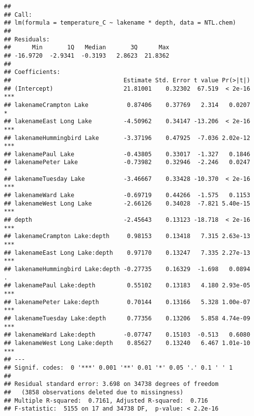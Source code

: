 \documentclass[]{article}
\newenvironment{Shaded}{\begin{snugshade}}{\end{snugshade}}
\newcommand{\CommentTok}[1]{\textcolor[rgb]{0.56,0.35,0.01}{\textit{#1}}}
\newcommand{\DataTypeTok}[1]{\textcolor[rgb]{0.13,0.29,0.53}{#1}}
\newcommand{\KeywordTok}[1]{\textcolor[rgb]{0.13,0.29,0.53}{\textbf{#1}}}
\newcommand{\NormalTok}[1]{#1}
\newcommand{\OperatorTok}[1]{\textcolor[rgb]{0.81,0.36,0.00}{\textbf{#1}}}
\newcommand{\StringTok}[1]{\textcolor[rgb]{0.31,0.60,0.02}{#1}}
\begin{document}
\begin{Shaded}
\end{Shaded}

\begin{verbatim}
## 
## Call:
## lm(formula = temperature_C ~ lakename * depth, data = NTL.chem)
## 
## Residuals:
##      Min       1Q   Median       3Q      Max 
## -16.9720  -2.9341  -0.3193   2.8623  21.8362 
## 
## Coefficients:
##                                Estimate Std. Error t value Pr(>|t|)    
## (Intercept)                    21.81001    0.32302  67.519  < 2e-16 ***
## lakenameCrampton Lake           0.87406    0.37769   2.314   0.0207 *  
## lakenameEast Long Lake         -4.50962    0.34147 -13.206  < 2e-16 ***
## lakenameHummingbird Lake       -3.37196    0.47925  -7.036 2.02e-12 ***
## lakenamePaul Lake              -0.43805    0.33017  -1.327   0.1846    
## lakenamePeter Lake             -0.73982    0.32946  -2.246   0.0247 *  
## lakenameTuesday Lake           -3.46667    0.33428 -10.370  < 2e-16 ***
## lakenameWard Lake              -0.69719    0.44266  -1.575   0.1153    
## lakenameWest Long Lake         -2.66126    0.34028  -7.821 5.40e-15 ***
## depth                          -2.45643    0.13123 -18.718  < 2e-16 ***
## lakenameCrampton Lake:depth     0.98153    0.13418   7.315 2.63e-13 ***
## lakenameEast Long Lake:depth    0.97170    0.13247   7.335 2.27e-13 ***
## lakenameHummingbird Lake:depth -0.27735    0.16329  -1.698   0.0894 .  
## lakenamePaul Lake:depth         0.55102    0.13183   4.180 2.93e-05 ***
## lakenamePeter Lake:depth        0.70144    0.13166   5.328 1.00e-07 ***
## lakenameTuesday Lake:depth      0.77356    0.13206   5.858 4.74e-09 ***
## lakenameWard Lake:depth        -0.07747    0.15103  -0.513   0.6080    
## lakenameWest Long Lake:depth    0.85627    0.13240   6.467 1.01e-10 ***
## ---
## Signif. codes:  0 '***' 0.001 '**' 0.01 '*' 0.05 '.' 0.1 ' ' 1
## 
## Residual standard error: 3.698 on 34738 degrees of freedom
##   (3858 observations deleted due to missingness)
## Multiple R-squared:  0.7161, Adjusted R-squared:  0.716 
## F-statistic:  5155 on 17 and 34738 DF,  p-value: < 2.2e-16
\end{verbatim}
\end{document}
